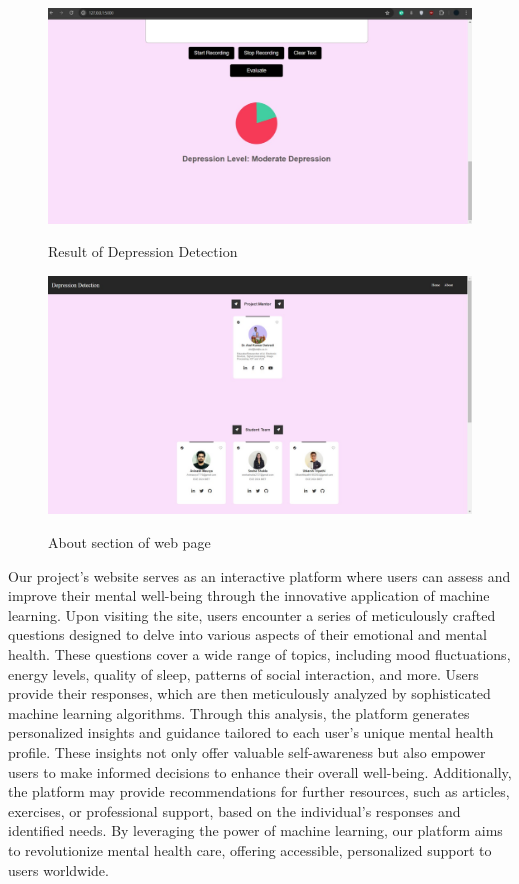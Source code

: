  \begin{figure}[htbp]
    \centering
     \includegraphics[width=1.0\linewidth]{C_chap/fig41.png}
\\\caption{Result of Depression Detection}
 \end{figure}
 \begin{figure}[htbp]
    \centering
     \includegraphics[width=1.0\linewidth]{C_chap/fig42.jpg}
\\\caption{About section of web page}
 \end{figure}
Our project's website serves as an interactive platform where users can assess and improve their mental well-being through the innovative application of machine learning. Upon visiting the site, users encounter a series of meticulously crafted questions designed to delve into various aspects of their emotional and mental health. These questions cover a wide range of topics, including mood fluctuations, energy levels, quality of sleep, patterns of social interaction, and more. Users provide their responses, which are then meticulously analyzed by sophisticated machine learning algorithms. Through this analysis, the platform generates personalized insights and guidance tailored to each user's unique mental health profile. These insights not only offer valuable self-awareness but also empower users to make informed decisions to enhance their overall well-being. Additionally, the platform may provide recommendations for further resources, such as articles, exercises, or professional support, based on the individual's responses and identified needs. By leveraging the power of machine learning, our platform aims to revolutionize mental health care, offering accessible, personalized support to users worldwide.
